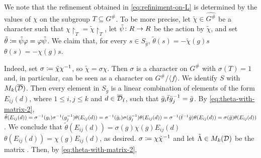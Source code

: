 We note that the refinement obtained in \cref{eq:refiniment-on-L} is determined by the values of $\chi$ on the subgroup $T \subseteq G^\#$. 
To be more precise, let $\tilde \chi \in \widehat {G^\#}$ be a character such that $\chi\restriction_{T} = \tilde\chi\restriction_{T}$, let $\tilde \psi \colon R\to R$ be the action by $\tilde \chi$, and set $\tilde \theta \coloneqq \tilde\psi \varphi = \varphi \tilde\psi$. 
We claim that, for every $s \in S_{\bar g}$, $\tilde\theta(s) = - \tilde\chi(g) s$ \IFF $\theta(s) = - \chi(g) s$. 

Indeed, set $\sigma \coloneqq \tilde\chi\chi^{-1}$, so $\tilde\chi = \sigma \chi$. 
Then $\sigma$ is a character on $G^\#$ with $\sigma(T) = 1$ and, in particular, can be seen as a character on $G^\#/\langle f \rangle$. 
We identify $S$ with $M_k(\barr \D)$. 
Then every element in $S_{\bar g}$ is a linear combination of elements of the form $E_{ij}(d)$, where $1 \leq i, j \leq k$ and $d\in \barr \D_{\bar t}$, such that $\bar g_i \bar t \bar g_j^{-1} = \bar g$. 
By \cref{eq:theta-with-matrix-2}, $\tilde\theta(E_{ij}(d)) = \sigma^{-1}(g_i) \sigma^{-1}(g_j^{-1}) \theta (E_{ij}(d)) = \sigma^{-1}(\bar g_i) \sigma(\bar g_j^{-1}) \theta (E_{ij}(d)) = \sigma^{-1}(\bar t^{-1} \bar g) \theta(E_{ij}(d)) = \sigma(\bar g) \theta(E_{ij}(d))$. 
We conclude that $\tilde\theta(E_{ij}(d)) = \sigma(g)\chi(g) E_{ij}(d)$ \IFF $\theta(E_{ij}(d)) = \chi(g) E_{ij}(d)$, as desired. 
$\sigma \coloneqq \chi \tilde\chi^{-1}$ and let $\tilde\Lambda \in M_k(\mathcal{D})$ be the matrix . Then, by \cref{eq:theta-with-matrix-2}, 




